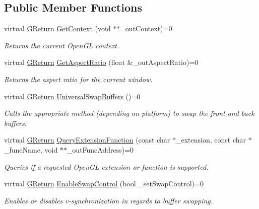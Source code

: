 \subsection*{Public Member Functions}
\begin{DoxyCompactItemize}
\item 
virtual \mbox{\hyperlink{namespace_g_w_a67a839e3df7ea8a5c5686613a7a3de21}{G\+Return}} \mbox{\hyperlink{class_g_w_1_1_g_r_a_p_h_i_c_s_1_1_g_open_g_l_surface_acc0962496aab996bddae1b84a5d178b9}{Get\+Context}} (void $\ast$$\ast$\+\_\+out\+Context)=0
\begin{DoxyCompactList}\small\item\em Returns the current Open\+GL context. \end{DoxyCompactList}\item 
virtual \mbox{\hyperlink{namespace_g_w_a67a839e3df7ea8a5c5686613a7a3de21}{G\+Return}} \mbox{\hyperlink{class_g_w_1_1_g_r_a_p_h_i_c_s_1_1_g_open_g_l_surface_ad660a6eed3ca53cc7eab24ae855b6572}{Get\+Aspect\+Ratio}} (float \&\+\_\+out\+Aspect\+Ratio)=0
\begin{DoxyCompactList}\small\item\em Returns the aspect ratio for the current window. \end{DoxyCompactList}\item 
virtual \mbox{\hyperlink{namespace_g_w_a67a839e3df7ea8a5c5686613a7a3de21}{G\+Return}} \mbox{\hyperlink{class_g_w_1_1_g_r_a_p_h_i_c_s_1_1_g_open_g_l_surface_a6a7fda7ba935e9fc22cd94ac47ebe886}{Universal\+Swap\+Buffers}} ()=0
\begin{DoxyCompactList}\small\item\em Calls the appropriate method (depending on platform) to swap the front and back buffers. \end{DoxyCompactList}\item 
virtual \mbox{\hyperlink{namespace_g_w_a67a839e3df7ea8a5c5686613a7a3de21}{G\+Return}} \mbox{\hyperlink{class_g_w_1_1_g_r_a_p_h_i_c_s_1_1_g_open_g_l_surface_a045548083dbdd547b18ef9b9a896f0de}{Query\+Extension\+Function}} (const char $\ast$\+\_\+extension, const char $\ast$\+\_\+func\+Name, void $\ast$$\ast$\+\_\+out\+Func\+Address)=0
\begin{DoxyCompactList}\small\item\em Queries if a requested Open\+GL extension or function is supported. \end{DoxyCompactList}\item 
virtual \mbox{\hyperlink{namespace_g_w_a67a839e3df7ea8a5c5686613a7a3de21}{G\+Return}} \mbox{\hyperlink{class_g_w_1_1_g_r_a_p_h_i_c_s_1_1_g_open_g_l_surface_a1a4d3e9f9e183a4987bf13187d802e66}{Enable\+Swap\+Control}} (bool \+\_\+set\+Swap\+Control)=0
\begin{DoxyCompactList}\small\item\em Enables or disables v-\/synchronization in regards to buffer swapping. \end{DoxyCompactList}\end{DoxyCompactItemize}


